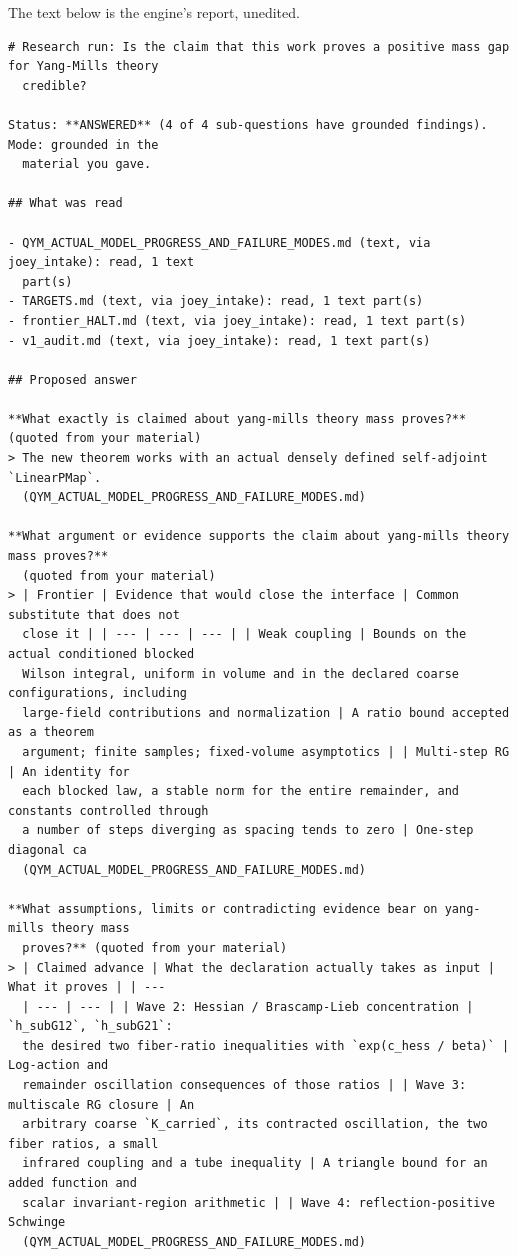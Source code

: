 \documentclass[11pt]{article}
\numberwithin{equation}{subsection}
\theoremstyle{plain}
\theoremstyle{definition}
\begin{document}
The text below is the engine's report, unedited.

{\footnotesize
\begin{verbatim}
# Research run: Is the claim that this work proves a positive mass gap for Yang-Mills theory
  credible?

Status: **ANSWERED** (4 of 4 sub-questions have grounded findings). Mode: grounded in the
  material you gave.

## What was read

- QYM_ACTUAL_MODEL_PROGRESS_AND_FAILURE_MODES.md (text, via joey_intake): read, 1 text
  part(s)
- TARGETS.md (text, via joey_intake): read, 1 text part(s)
- frontier_HALT.md (text, via joey_intake): read, 1 text part(s)
- v1_audit.md (text, via joey_intake): read, 1 text part(s)

## Proposed answer

**What exactly is claimed about yang-mills theory mass proves?** (quoted from your material)
> The new theorem works with an actual densely defined self-adjoint `LinearPMap`.
  (QYM_ACTUAL_MODEL_PROGRESS_AND_FAILURE_MODES.md)

**What argument or evidence supports the claim about yang-mills theory mass proves?**
  (quoted from your material)
> | Frontier | Evidence that would close the interface | Common substitute that does not
  close it | | --- | --- | --- | | Weak coupling | Bounds on the actual conditioned blocked
  Wilson integral, uniform in volume and in the declared coarse configurations, including
  large-field contributions and normalization | A ratio bound accepted as a theorem
  argument; finite samples; fixed-volume asymptotics | | Multi-step RG | An identity for
  each blocked law, a stable norm for the entire remainder, and constants controlled through
  a number of steps diverging as spacing tends to zero | One-step diagonal ca
  (QYM_ACTUAL_MODEL_PROGRESS_AND_FAILURE_MODES.md)

**What assumptions, limits or contradicting evidence bear on yang-mills theory mass
  proves?** (quoted from your material)
> | Claimed advance | What the declaration actually takes as input | What it proves | | ---
  | --- | --- | | Wave 2: Hessian / Brascamp-Lieb concentration | `h_subG12`, `h_subG21`:
  the desired two fiber-ratio inequalities with `exp(c_hess / beta)` | Log-action and
  remainder oscillation consequences of those ratios | | Wave 3: multiscale RG closure | An
  arbitrary coarse `K_carried`, its contracted oscillation, the two fiber ratios, a small
  infrared coupling and a tube inequality | A triangle bound for an added function and
  scalar invariant-region arithmetic | | Wave 4: reflection-positive Schwinge
  (QYM_ACTUAL_MODEL_PROGRESS_AND_FAILURE_MODES.md)


\end{verbatim}}
\end{document}
